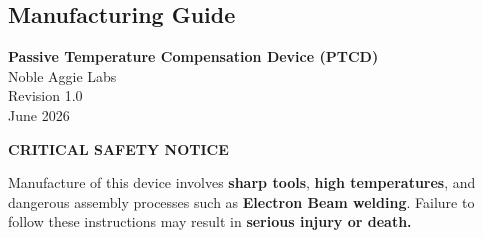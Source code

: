\documentclass[12pt, letterpaper]{report}%
\begin{document}
\begin{appendices}
	\chapter*{Manufacturing Guide}
	\label{app:mfg}
	\setcounter{section}{0}
	\renewcommand{\thesection}{\arabic{section}}

	\begin{center}
		{\Large \textbf{Passive Temperature Compensation Device (PTCD)}} \\[4pt]
		Noble Aggie Labs \\
		Revision 1.0 \\
		June 2026
	\end{center}

	\bigskip


	\begin{warningbox}
		\textbf{\large \textcolor{warnred}{CRITICAL SAFETY NOTICE}}

		\medskip
		Manufacture of this device involves \textbf{sharp tools}, \textbf{high temperatures},
		and dangerous assembly processes such as \textbf{Electron Beam welding}.
		Failure to follow these instructions may result in \textbf{serious injury or death.}


\end{warningbox}
\end{appendices}
\end{document}
